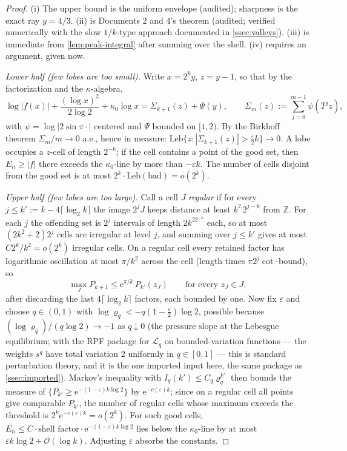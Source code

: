 \documentclass[11pt,oneside]{article}
\theoremstyle{definition}
\theoremstyle{remark}
\newcommand{\Z}{\mathbb Z}
\newcommand{\e}{\mathrm e}
\newcommand{\bigO}{\mathcal O}
\newcommand{\smallo}{o}
\newcommand{\T}{T}
\newcommand{\Lop}{\mathcal L}
\begin{document}
\begin{proof}
(i) The upper bound is the uniform envelope (audited); sharpness is the
exact ray $y=4/3$.  (ii) is Documents 2 and 4's theorem (audited;
verified numerically with the slow $1/k$-type approach documented in
\cref{ssec:valleys}).  (iii) is immediate from \cref{lem:peak-integral}
after summing over the shell.  (iv) requires an argument, given now.

\emph{Lower half (few lobes are too small).}  Write $x=2^ky$,
$z=y-1$, so that by the factorization and the $\kappa$-algebra,
\[
 \log|f(x)|+\frac{(\log x)^2}{2\log2}+\kappa_0\log x
 =\Sigma_{k+1}(z)+\Psi(y),
 \qquad
 \Sigma_m(z):=\sum_{j=0}^{m-1}\psi(\T^jz),
\]
with $\psi=\log|2\sin\pi\cdot|$ centered and $\Psi$ bounded on
$[1,2)$.  By the Birkhoff theorem $\Sigma_m/m\to0$ a.e., hence in
measure: $\mathrm{Leb}\{z:|\Sigma_{k+1}(z)|>\tfrac\varepsilon2k\}\to0$.
A lobe occupies a $z$-cell of length $2^{-k}$; if the cell contains a
point of the good set, then $E_n\ge|f|$ there exceeds the
$\kappa_0$-line by more than $-\varepsilon k$.  The number of cells
disjoint from the good set is at most $2^k\cdot\mathrm{Leb}(\text{bad})
=\smallo(2^k)$.

\emph{Upper half (few lobes are too large).}  Call a cell $J$
\emph{regular} if for every $j\le k':=k-4\lceil\log_2k\rceil$ the image
$2^jJ$ keeps distance at least $k^2\,2^{j-k}$ from $\Z$.  For each $j$
the offending set is $2^j$ intervals of length $2k^22^{-k}$ each, so at
most $(2k^2+2)2^j$ cells are irregular at level $j$, and summing over
$j\le k'$ gives at most $C2^k/k^2=\smallo(2^k)$ irregular cells.  On a
regular cell every retained factor has logarithmic oscillation at most
$\pi/k^2$ across the cell (length times $\pi2^j\cot$-bound), so
\[
 \max_{J}P_{k+1}\le\e^{\pi/k}\,P_{k'}(z_J)
 \qquad\text{for every } z_J\in J,
\]
after discarding the last $4\lceil\log_2k\rceil$ factors, each bounded by
one.  Now fix $\varepsilon$ and choose $q\in(0,1)$ with
$\log\varrho_q<-q(1-\tfrac\varepsilon2)\log2$, possible because
$(\log\varrho_q)/(q\log2)\to-1$ as $q\downarrow0$ (the pressure slope at
the Lebesgue equilibrium; with the RPF package for $\Lop_q$ on
bounded-variation functions --- the weights $s^q$ have total variation
$2$ uniformly in $q\in[0,1]$ --- this is standard perturbation theory,
and it is the one imported input here, the same package as
\cref{ssec:imported}).  Markov's inequality with
$I_q(k')\le C_q\varrho_q^{k'}$ then bounds the measure of
$\{P_{k'}\ge\e^{-(1-\varepsilon)k\log2}\}$ by $\e^{-c(\varepsilon)k}$;
since on a regular cell all points give comparable $P_{k'}$, the number
of regular cells whose maximum exceeds the threshold is
$2^k\e^{-c(\varepsilon)k}=\smallo(2^k)$.  For such good cells,
$E_n\le C\cdot\text{shell factor}\cdot\e^{-(1-\varepsilon)k\log2}$ lies
below the $\kappa_0$-line by at most $\varepsilon k\log 2+\bigO(\log k)$.
Adjusting $\varepsilon$ absorbs the constants.
\end{proof}
\end{document}
